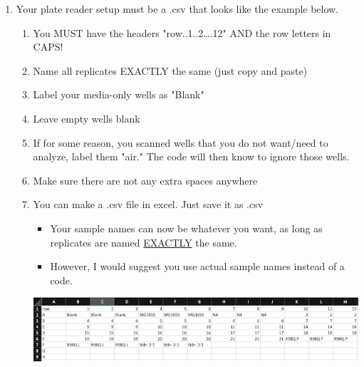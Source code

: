 \documentclass[12pt]{article}
\begin{document}
\begin{enumerate}
\item Your plate reader setup must be a .csv that looks like the example
below.

\begin{enumerate}
\item You MUST have the headers "row..1..2\ldots{}.12" AND the row letters in
CAPS!
\item Name all replicates EXACTLY the same (just copy and paste)
\item Label your media-only wells as "Blank"
\item Leave empty wells blank
\item If for some reason, you scanned wells that you do not want/need to
analyze, label them "air." The code will then know to ignore those
wells.
\item Make sure there are not any extra spaces anywhere
\item You can make a .csv file in excel. Just save it as .csv
\begin{itemize}
\item Your sample names can now be whatever you want, as long as replicates are named \uline{EXACTLY} the same.
\item However, I would suggest you use actual sample names instead of a code.
\end{itemize}

\begin{center}
\includegraphics[width=.9\linewidth]{./process_plate_reader_data_image03.png}
\end{center}
\end{enumerate}
\end{enumerate}
\end{document}

